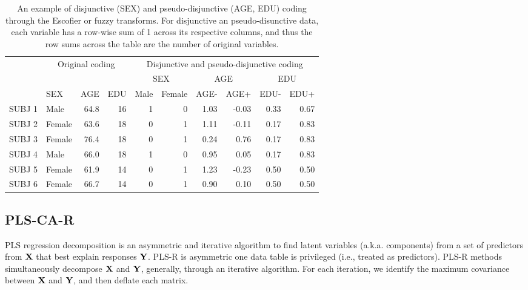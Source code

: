 \documentclass[12pt]{article}
\begin{document}
\begin{table}[!h]

\caption{\label{tab:unnamed-chunk-1}\label{table:disj} An example of disjunctive (SEX) and pseudo-disjunctive (AGE, EDU) coding through the Escofier or fuzzy transforms. For disjunctive an pseudo-disunctive data, each variable has a row-wise sum of 1 across its respective columns, and thus the row sums across the table are the number of original variables.}
\centering
\begin{tabular}[t]{llrrrrrrrr}
\toprule
\multicolumn{1}{c}{ } & \multicolumn{3}{c}{Original coding} & \multicolumn{6}{c}{Disjunctive and pseudo-disjunctive coding} \\
\cmidrule(l{2pt}r{2pt}){2-4} \cmidrule(l{2pt}r{2pt}){5-10}
\multicolumn{4}{c}{ } & \multicolumn{2}{c}{SEX} & \multicolumn{2}{c}{AGE} & \multicolumn{2}{c}{EDU} \\
\cmidrule(l{2pt}r{2pt}){5-6} \cmidrule(l{2pt}r{2pt}){7-8} \cmidrule(l{2pt}r{2pt}){9-10}
  & SEX & AGE & EDU & Male & Female & AGE- & AGE+ & EDU- & EDU+\\
\midrule
SUBJ 1 & Male & 64.8 & 16 & 1 & 0 & 1.03 & -0.03 & 0.33 & 0.67\\
SUBJ 2 & Female & 63.6 & 18 & 0 & 1 & 1.11 & -0.11 & 0.17 & 0.83\\
SUBJ 3 & Female & 76.4 & 18 & 0 & 1 & 0.24 & 0.76 & 0.17 & 0.83\\
SUBJ 4 & Male & 66.0 & 18 & 1 & 0 & 0.95 & 0.05 & 0.17 & 0.83\\
SUBJ 5 & Female & 61.9 & 14 & 0 & 1 & 1.23 & -0.23 & 0.50 & 0.50\\
\addlinespace
SUBJ 6 & Female & 66.7 & 14 & 0 & 1 & 0.90 & 0.10 & 0.50 & 0.50\\
\bottomrule
\end{tabular}
\end{table}

\hypertarget{pls-ca-r}{%
\subsection{PLS-CA-R}\label{pls-ca-r}}

\label{section:plscar_form}

PLS regression
\citep{wold_soft_1975, wold_collinearity_1984, wold_pls-regression_2001}
decomposition is an asymmetric and iterative algorithm to find latent
variables (a.k.a. components) from a set of predictors from \({\bf X}\)
that best explain responses \({\bf Y}\). PLS-R is asymmetric one data
table is privileged (i.e., treated as predictors). PLS-R methods
simultaneously decompose \({\bf X}\) and \({\bf Y}\), generally, through
an iterative algorithm. For each iteration, we identify the maximum
covariance between \({\bf X}\) and \({\bf Y}\), and then deflate each
matrix.
\end{document}
